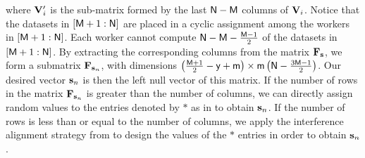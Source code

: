 \documentclass[conference,letterpaper]{IEEEtran}
\begin{document}
where ${\bf V}'_i$ is the sub-matrix formed by the last ${\sf N} - {\sf M}$ columns of ${\bf V}_i$.
Notice that the datasets in $[{\sf M}+1 : {\sf N}]$ are placed in a cyclic assignment among the workers in $[{\sf M}+1 : {\sf N}]$. Each worker cannot compute ${\sf N} - {\sf M} - \frac{{\sf M} - 1}{2}$ of the datasets in $[{\sf M}+1 : {\sf N}]$. By extracting the corresponding columns from the matrix ${\bf F}_{\bf s}$, we form a submatrix ${\bf F}_{{\bf s}_n}$, with dimensions 
$\left(\frac{{\sf M} + 1}{2} - {\sf y} + {\sf m}\right) \times {\sf m} \left({\sf N} - \frac{3{\sf M} - 1}{2}\right)$.
Our desired vector ${\bf s}_n$ is then the left null vector of this matrix.
If the number of rows in the matrix ${\bf F}_{{\bf s}_n}$ is greater than the number of columns, we can directly assign random values to the entries denoted by $*$ as in \cite{wan2022secure} to obtain ${\bf s}_n$. If the number of rows is less than or equal to the number of columns, we apply the interference alignment strategy from \cite{limit} to design the values of the $*$ entries in order to obtain ${\bf s}_n$.
\end{document}
